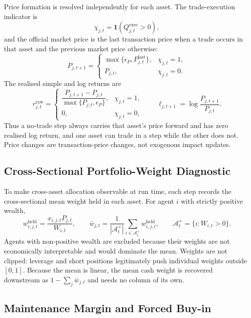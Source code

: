 \documentclass[12pt, a4paper]{article}
\begin{document}
    Price formation is resolved independently for each asset. The trade-execution
    indicator is
    \[
        \chi_{j,t}=\mathbf{1}\!\left(Q_{j,t}^{\mathrm{exec}}>0\right),
    \]
    and the official market price is the last transaction price when a trade
    occurs in that asset and the previous market price otherwise:
    \[
        P_{j,t+1}=
        \begin{cases}
            \max\{\epsilon_P,P_{j,t}^{\mathrm{last}}\}, & \chi_{j,t}=1,\\
            P_{j,t}, & \chi_{j,t}=0.
        \end{cases}
    \]
    The realised simple and log returns are
    \[
        r_{j,t}^{\mathrm{raw}}=
        \begin{cases}
            \dfrac{P_{j,t+1}-P_{j,t}}{\max\{P_{j,t},\epsilon_P\}}, & \chi_{j,t}=1,\\[1.4ex]
            0, & \chi_{j,t}=0,
        \end{cases}
        \qquad
        \ell_{j,t+1}=\log\frac{P_{j,t+1}}{P_{j,t}}.
    \]
    Thus a no-trade step always carries that asset's price forward and has zero
    realised log return, and one asset can trade in a step while the other does
    not. Price changes are transaction-price changes, not exogenous impact
    updates.

    \subsection{Cross-Sectional Portfolio-Weight Diagnostic}

    To make cross-asset allocation observable at run time, each step records the
    cross-sectional mean weight held in each asset. For agent \(i\) with strictly
    positive wealth,
    \[
        w_{i,j,t}^{\mathrm{held}}
        =
        \frac{x_{i,j,t}P_{j,t}}{W_{i,t}},
        \qquad
        \bar w_{j,t}
        =
        \frac{1}{|\mathcal{A}_t^{+}|}
        \sum_{i\in\mathcal{A}_t^{+}} w_{i,j,t}^{\mathrm{held}},
        \qquad
        \mathcal{A}_t^{+}=\{i:W_{i,t}>0\}.
    \]
    Agents with non-positive wealth are excluded because their weights are not
    economically interpretable and would dominate the mean. Weights are not
    clipped: leverage and short positions legitimately push individual weights
    outside \([0,1]\). Because the mean is linear, the mean cash weight is
    recovered downstream as \(1-\sum_j\bar w_{j,t}\) and needs no column of its
    own.

    \subsection{Maintenance Margin and Forced Buy-in}
\end{document}
